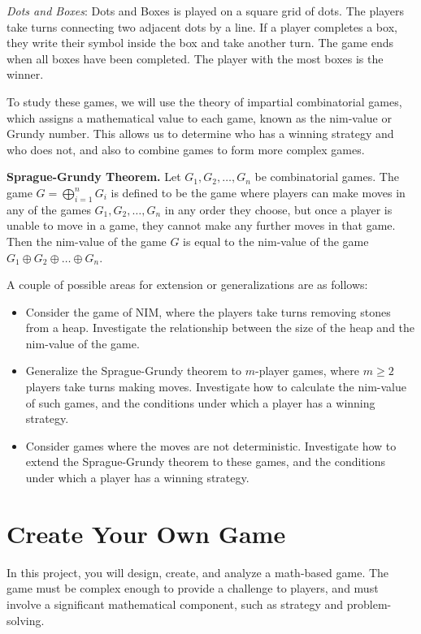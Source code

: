 \documentclass{article}
\begin{document}
    \vspace{3mm}
    \textit{Dots and Boxes}: Dots and Boxes is played on a square grid of dots. The players take turns connecting two adjacent dots by a line. If a player completes a box, they write their symbol inside the box and take another turn. The game ends when all boxes have been completed. The player with the most boxes is the winner.
    
    \vspace{3mm}
    To study these games, we will use the theory of impartial combinatorial games, which assigns a mathematical value to each game, known as the nim-value or Grundy number. This allows us to determine who has a winning strategy and who does not, and also to combine games to form more complex games.
    
    \vspace{3mm}
    \textbf{Sprague-Grundy Theorem.}
    Let $G_1, G_2, \dots, G_n$ be combinatorial games. The game $G = \bigoplus_{i=1}^n G_i$ is defined to be the game where players can make moves in any of the games $G_1, G_2, \dots, G_n$ in any order they choose, but once a player is unable to move in a game, they cannot make any further moves in that game. Then the nim-value of the game $G$ is equal to the nim-value of the game $G_1 \oplus G_2 \oplus \dots \oplus G_n$.
    
    \vspace{3mm}
    A couple of possible areas for extension or generalizations are as follows:
    \begin{itemize}
    \item Consider the game of NIM, where the players take turns removing stones from a heap. Investigate the relationship between the size of the heap and the nim-value of the game.
    \item Generalize the Sprague-Grundy theorem to $m$-player games, where $m \ge 2$ players take turns making moves. Investigate how to calculate the nim-value of such games, and the conditions under which a player has a winning strategy.
    \item Consider games where the moves are not deterministic. Investigate how to extend the Sprague-Grundy theorem to these games, and the conditions under which a player has a winning strategy.
    \end{itemize}
    
\pagebreak

\section{Create Your Own Game}
    In this project, you will design, create, and analyze a math-based game. The game must be complex enough to provide a challenge to players, and must involve a significant mathematical component, such as strategy and problem-solving.
    
\end{document}
